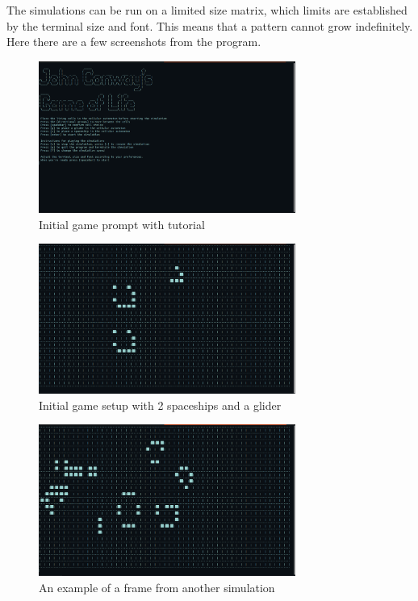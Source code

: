 \documentclass[10pt]{article}
\begin{document}
    The simulations can be run on a limited size matrix, which limits are established by the terminal size and font. This means that a pattern cannot grow indefinitely.
    Here there are a few screenshots from the program.

    \begin{figure}[h]
        \centering
        \includegraphics[width=0.75\textwidth]{images/prompt.png}
        \caption{Initial game prompt with tutorial}
        \label{fig:prompt}
    \end{figure}

    \begin{figure}[h]
        \centering
        \includegraphics[width=0.75\textwidth]{images/game.png}
        \caption{Initial game setup with 2 spaceships and a glider}
        \label{fig:initialize}
    \end{figure}

    \begin{figure}[h!]
        \centering
        \includegraphics[width=0.75\textwidth]{images/game2.png}
        \caption{An example of a frame from another simulation}
        \label{fig:running}
    \end{figure}
\end{document}
